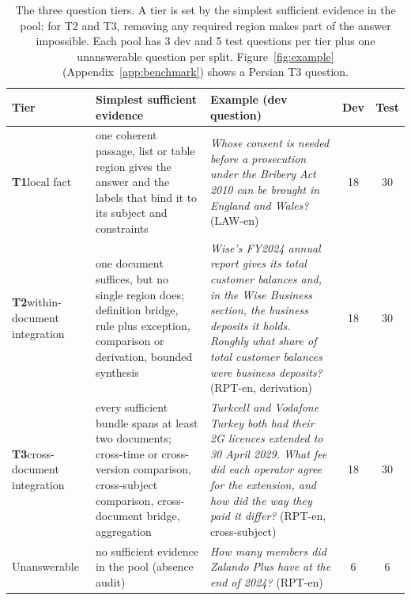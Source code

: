 \begin{table}[t]
\centering
\small
\renewcommand{\arraystretch}{1.15}
\begin{tabularx}{\textwidth}{@{}>{\raggedright\arraybackslash}p{2.1cm}>{\raggedright\arraybackslash}p{4.6cm}>{\raggedright\arraybackslash}Xcc@{}}
\toprule
Tier & Simplest sufficient evidence & Example (dev question) & Dev & Test \\
\midrule
\textbf{T1}\newline local fact & one coherent passage, list or table region gives the answer and the labels that bind it to its subject and constraints & \emph{Whose consent is needed before a prosecution under the Bribery Act 2010 can be brought in England and Wales?} (LAW-en) & 18 & 30 \\
\addlinespace
\textbf{T2}\newline within-document integration & one document suffices, but no single region does; definition bridge, rule plus exception, comparison or derivation, bounded synthesis & \emph{Wise's FY2024 annual report gives its total customer balances and, in the Wise Business section, the business deposits it holds. Roughly what share of total customer balances were business deposits?} (RPT-en, derivation) & 18 & 30 \\
\addlinespace
\textbf{T3}\newline cross-document integration & every sufficient bundle spans at least two documents; cross-time or cross-version comparison, cross-subject comparison, cross-document bridge, aggregation & \emph{Turkcell and Vodafone Turkey both had their 2G licences extended to 30 April 2029. What fee did each operator agree for the extension, and how did the way they paid it differ?} (RPT-en, cross-subject) & 18 & 30 \\
\addlinespace
Unanswerable & no sufficient evidence in the pool (absence audit) & \emph{How many members did Zalando Plus have at the end of 2024?} (RPT-en) & 6 & 6 \\
\bottomrule
\end{tabularx}
\caption{The three question tiers. A tier is set by the simplest sufficient evidence in the pool; for T2 and T3, removing any required region makes part of the answer impossible. Each pool has 3 dev and 5 test questions per tier plus one unanswerable question per split. Figure~\ref{fig:example} (Appendix~\ref{app:benchmark}) shows a Persian T3 question.}
\label{tab:tiers}
\end{table}
